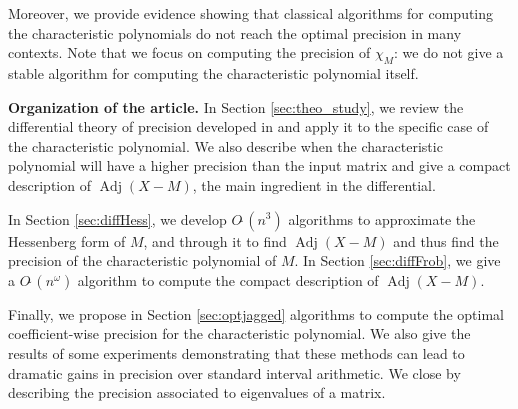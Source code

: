 \documentclass[sigconf]{acmart}
\DeclareMathOperator{\adj}{Adj}
\newcommand{\softO}{O\tilde{~}}
\theoremstyle{definition}
\begin{document}
Moreover, we provide evidence showing that classical algorithms for 
computing the characteristic polynomials do not reach the optimal 
precision in many contexts.
Note that we focus on computing the precision of $\chi_M$: we do not give a stable
algorithm for computing the characteristic polynomial itself.

\medskip

\noindent
{\bf Organization of the article.}
In Section \ref{sec:theo_study}, we review the differential
theory of precision developed in \cite{caruso-roe-vaccon:14a}
and apply it to the specific case of the characteristic polynomial.
We also describe when the characteristic polynomial will have a higher
precision than the input matrix and give a compact description
of $\adj(X-M)$, the main ingredient in the differential.

In Section \ref{sec:diffHess}, we develop $\softO(n^3)$ algorithms to approximate
the Hessenberg form of $M$, and through it to find $\adj(X-M)$ and thus
find the precision of the characteristic polynomial of $M$.  In Section \ref{sec:diffFrob},
we give a $\softO(n^\omega)$ algorithm to compute the compact description of $\adj(X-M)$.

Finally, we propose in Section \ref{sec:optjagged}
algorithms to compute the optimal coefficient-wise precision
for the characteristic polynomial.  We also give the results
of some experiments demonstrating that these methods can lead
to dramatic gains in precision over standard interval arithmetic.
We close by describing the precision associated to
eigenvalues of a matrix.

\medskip
\end{document}
